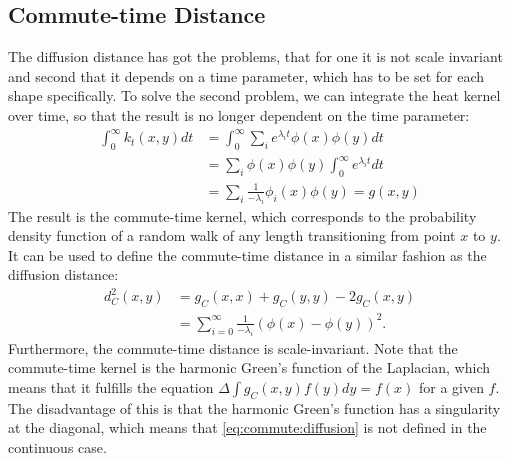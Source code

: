 \subsection{Commute-time Distance}
\label{subsection:commute}
The diffusion distance has got the problems, that for one it is not scale invariant and second that it depends on a time parameter, which has to be set for each shape specifically.
To solve the second problem, we can integrate the heat kernel over time, so that the result is no longer dependent on the time parameter:
\begin{equation}
	\begin{split}
		\int_0^{\infty} k_t(x,y)dt &= \int_0^{\infty} \sum_i e^{\lambda_i t}\phi(x)\phi(y) dt \\
		&= \sum_i \phi(x)\phi(y) \int_0^{\infty} e^{\lambda_i t} dt \\
		&= \sum_i \frac{1}{-\lambda_i} \phi_i(x) \phi(y) = g(x,y)
	\end{split}
	\label{eq:commute:kernel}
\end{equation}
The result is the commute-time kernel, which corresponds to the probability density function of a random walk of any length transitioning from point $x$ to $y$.
It can be used to define the commute-time distance in a similar fashion as the diffusion distance:
\begin{align}
	d_C^2(x,y) &= g_C(x,x) + g_C(y,y) -2g_C(x,y) \label{eq:commute:diffusion} \\
	&= \sum_{i=0}^{\infty} \frac{1}{-\lambda_i} (\phi(x)-\phi(y))^2. \label{eq:commute}
\end{align}
Furthermore, the commute-time distance is scale-invariant.
Note that the commute-time kernel is the harmonic Green's function of the Laplacian, which means that it fulfills the equation $\Delta \int g_C(x,y) f(y) dy  = f(x)$ for a given $f$.
The disadvantage of this is that the harmonic Green's function has a singularity at the diagonal, which means that \eqref{eq:commute:diffusion} is not defined in the continuous case.

